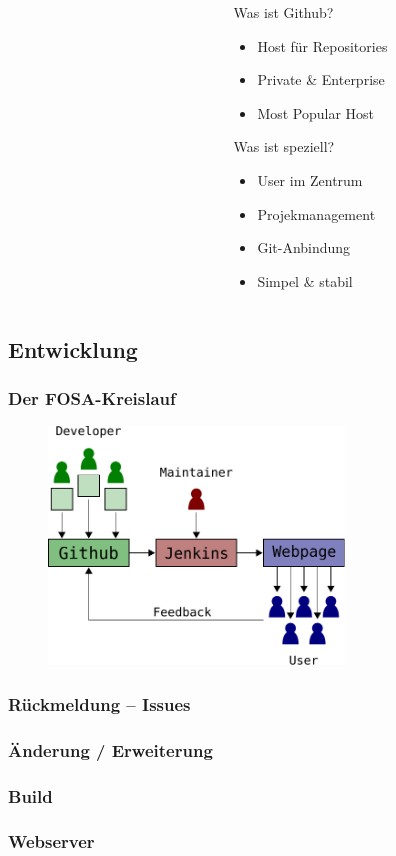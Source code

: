 \begin{frame}
\begin{columns}
\begin{column}{5cm}
\begin{figure}
			\end{figure}
		\end{column}
		\begin{column}{5cm}
			\begin{block}{Was ist Github?}
		                \begin{itemize}
					\item Host für Repositories
					\item Private \& Enterprise
					\item Most Popular Host
				\end{itemize}
			\end{block}
			\begin{block}{Was ist speziell?}
				\begin{itemize}
					\item User im Zentrum
					\item Projekmanagement
					\item Git-Anbindung
					\item Simpel \& stabil
				\end{itemize}
			\end{block}
		\end{column}
	\end{columns}
\end{frame}

\subsection{Entwicklung}
\begin{frame}
	\frametitle{Der FOSA-Kreislauf}
	\begin{figure}
		\centering
		\includegraphics[width=0.7\textwidth]{fig/fosa-loop.pdf}

	\end{figure}
\end{frame}

\begin{frame}
	\frametitle{Rückmeldung -- Issues}
\end{frame}

\begin{frame}
	\frametitle{Änderung / Erweiterung}
\end{frame}

\begin{frame}
	\frametitle{Build}
\end{frame}

\begin{frame}
	\frametitle{Webserver}
\end{frame}
